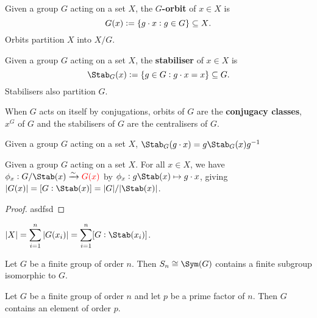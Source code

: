 \documentclass[../Year2.tex]{subfiles}
\begin{document}
\begin{definition}[Orbit]
    Given a group $G$ acting on a set $X$, the \textbf{$G$-orbit} of $x\in X$ is \[
        G(x):=\{g\cdot x:g\in G\} \subseteq X
    \text{\textcolor{black}{.}}
    \] Orbits partition $X$ into $X/G$.
\end{definition}

\begin{definition}[Stabiliser]
    Given a group $G$ acting on a set $X$, the \textbf{stabiliser} of $x\in X$ is \[
        \Stab_G(x):= \{g\in G: g\cdot x = x\} \subseteq G
        \black{.}
        \] Stabilisers also partition $G$.
    \end{definition}
    
\begin{remark}
    When $G$ acts on itself by conjugations, orbits of $G$ are the \textbf{conjugacy classes}, $x^G$ of $G$ and the stabilisers of $G$ are the centralisers of $G$.
\end{remark}

\begin{lemma}
    Given a group $G$ acting on a set $X$, $\Stab_G(g\cdot x)=g\Stab_G(x)g^{-1}$
\end{lemma}

\begin{theorem}
    Given a group $G$ acting on a set $X$. For all $x\in X$, we have $\phi_x:G/\Stab(x)\xrightarrow{\sim}\textcolor{red}{G(x)}$ by $\phi_x:g\Stab(x)\mapsto g\cdot x$, giving $|G(x)| = [G:\Stab(x)] = |G|/|\Stab(x)|$.
    \begin{proof}
        asdfsd
    \end{proof}
\end{theorem}

\vspace{-15pt}

\begin{corollary}
    $\displaystyle|X| = \sum_{i=1}^n|G(x_i)| = \sum_{i=1}^n[G:\Stab(x_i)]$. 
\end{corollary}

\begin{corollary}
    Let $G$ be a finite group of order $n$. Then $S_n\cong\Sym(G)$ contains a finite subgroup isomorphic to $G$.
\end{corollary}

\begin{corollary}
    Let $G$ be a finite group of order $n$ and let $p$ be a prime factor of $n$. Then $G$ contains an element of order $p$.
\end{corollary}
\end{document}
